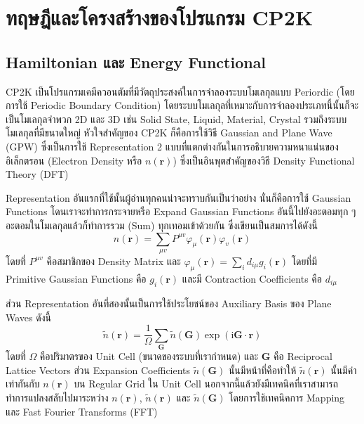 

\chapter{ทฤษฎีและโครงสร้างของโปรแกรม CP2K}
\label{ap:cp2k}

\section{Hamiltonian และ Energy Functional}

CP2K เป็นโปรแกรมเคมีควอนตัมที่มีวัตถุประสงค์ในการจำลองระบบโมเลกุลแบบ Periordic (โดยการใช้ Periodic Boundary Condition) โดยระบบโมเลกุลที่เหมาะกับการจำลองประเภทนี้นั้นก็จะเป็นโมเลกุลจำพวก 2D และ 3D เช่น Solid State, Liquid, Material, Crystal รวมถึงระบบโมเลกุลที่มีขนาดใหญ่ หัวใจสำคัญของ CP2K ก็คือการใช้วิธี Gaussian and Plane Wave (GPW) ซึ่งเป็นการใช้ Representation 2 แบบที่แตกต่างกันในการอธิบายความหนาแน่นของอิเล็กตรอน (Electron Density หรือ $n(\boldsymbol{r})$) ซึ่งเป็นอินพุตสำคัญของวิธี Density Functional Theory (DFT) 

Representation อันแรกที่ใช้นั้นผู้อ่านทุกคนน่าจะทราบกันเป็นว่าอย่าง นั่นก็คือการใช้ Gaussian Functions โดนเราจะทำการกระจายหรือ Expand Gaussian Functions อันนี้ไปยังอะตอมทุก ๆ อะตอมในโมเลกุลแล้วก็ทำการรวม (Sum) ทุกเทอมเข้าด้วยกัน ซึ่งเขียนเป็นสมการได้ดังนี้ 
%
\begin{equation}
    n(\boldsymbol{r})
    =
    \sum_{\mu v} P^{\mu v} \varphi_\mu(\boldsymbol{r}) \varphi_v(\boldsymbol{r})
\end{equation}
%
โดยที่ $P^{\mu v}$ คือสมาชิกของ Density Matrix และ $\varphi_\mu(\boldsymbol{r}) = \sum_i d_{i \mu} g_i(\boldsymbol{r})$ โดยที่มี Primitive Gaussian Functions คือ $g_i(\boldsymbol{r})$ และมี Contraction Coefficients คือ $d_{i \mu}$ 

ส่วน Representation อันที่สองนั้นเป็นการใช้ประโยชน์ของ Auxiliary Basis ของ Plane Waves ดังนี้
%
\begin{equation}
    \tilde{n}(\boldsymbol{r})
    =
    \frac{1}{\Omega} \sum_{\boldsymbol{G}} \tilde{n}(\boldsymbol{G}) 
    \exp (\mathrm{i} \boldsymbol{G} \cdot \boldsymbol{r})
\end{equation}
%
โดยที่ $\Omega$ คือปริมาตรของ Unit Cell (ขนาดของระบบที่เรากำหนด) และ $\boldsymbol{G}$ คือ Reciprocal Lattice Vectors ส่วน Expansion Coefficients $\tilde{n}(\boldsymbol{G})$ นั้นมีหน้าที่คือทำให้ $\tilde{n}(\boldsymbol{r})$ นั้นมีค่าเท่ากันกับ $n(\boldsymbol{r})$ บน Regular Grid ใน Unit Cell นอกจากนี้แล้วยังมีเทคนิคที่เราสามารถทำการแปลงสลับไปมาระหว่าง $n(\boldsymbol{r})$, $\tilde{n}(\boldsymbol{r})$ และ $\tilde{n}(\boldsymbol{G})$ โดยการใช้เทคนิคการ Mapping และ Fast Fourier Transforms (FFT)

